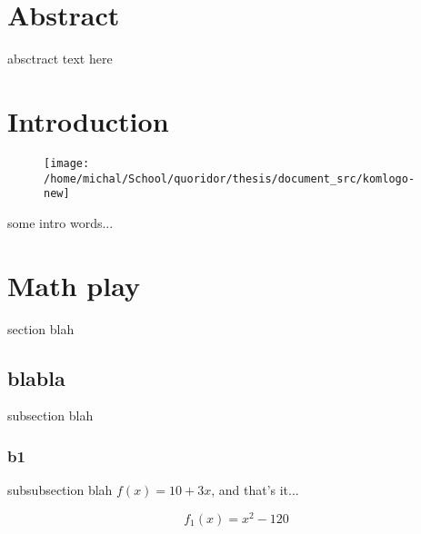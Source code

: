 \documentclass[12pt, oneside]{book}
\author{\mfauthor}
\title{\thesisname}
\date{\mfyear}
\begin{document}
\maketitle
\newpage

  \section{Abstract}
  absctract text here
  \newpage

  \section{Introduction}
    \begin{figure}
      \texttt{[image: /home/michal/School/quoridor/thesis/document\_src/komlogo-new]}
    \end{figure}
    some intro words...

  \newpage
  \section{Math play}
    section blah

    \subsection{blabla}
      subsection blah

      \subsubsection{b1}
        subsubsection blah $f(x) = 10 + 3x$, and that's it...

        \begin{equation*}
          f_1(x) = x^2 - 120
        \end{equation*}
\end{document}
